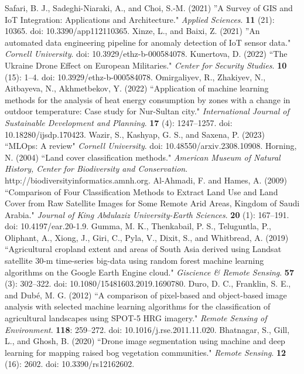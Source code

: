 \documentclass[3p,times,procedia]{elsarticle}
\begin{document}
\begin{thebibliography}{}
Safari, B. J., Sadeghi-Niaraki, A., and Choi, S.-M. (2021) ''A Survey of GIS and IoT Integration: Applications and Architecture." {\it Applied Sciences}. {\bf 11} (21): 10365. doi: 10.3390/app112110365.
Xinze, L., and Baixi, Z. (2021) ''An automated data engineering pipeline for anomaly detection of IoT sensor data." {\it Cornell University}. doi: 10.3929/ethz-b-000584078.
Kunertova, D. (2022) ``The Ukraine Drone Effect on European Militaries." {\it  Center for Security Studies}. {\bf 10} (15): 1--4. doi: 10.3929/ethz-b-000584078.
Omirgaliyev, R., Zhakiyev, N., Aitbayeva, N., Akhmetbekov, Y. (2022) ``Application of machine learning methods for the analysis of heat energy consumption by zones with a change in outdoor temperature: Case study for Nur-Sultan city." {\it  International Journal of Sustainable Development and Planning}. {\bf 17} (4): 1247--1257. doi: 10.18280/ijsdp.170423.
Wazir, S., Kashyap, G. S., and Saxena, P. (2023) ``MLOps: A review" {\it  Cornell University}. doi: 10.48550/arxiv.2308.10908.
Horning, N. (2004) ``Land cover classification methods." {\it American Museum of Natural History, Center for Biodiversity and Conservation}. http://biodiversityinformatics.amnh.org.
Al-Ahmadi, F. and Hames, A. (2009) ``Comparison of Four Classification Methods to Extract Land Use and Land Cover from Raw Satellite Images for Some Remote Arid Areas, Kingdom of Saudi Arabia." {\it Journal of King Abdulaziz University-Earth Sciences}. {\bf 20} (1): 167--191. doi: 10.4197/ear.20-1.9.
Gumma, M. K., Thenkabail, P. S., Teluguntla, P., Oliphant, A., Xiong, J., Giri, C., Pyla, V., Dixit, S., and Whitbread, A. (2019) ``Agricultural cropland extent and areas of South Asia derived using Landsat satellite 30-m time-series big-data using random forest machine learning algorithms on the Google Earth Engine cloud." {\it Giscience & Remote Sensing}. {\bf 57} (3): 302--322. doi: 10.1080/15481603.2019.1690780.
Duro, D. C., Franklin, S. E., and Dubé, M. G. (2012) ``A comparison of pixel-based and object-based image analysis with selected machine learning algorithms for the classification of agricultural landscapes using SPOT-5 HRG imagery." {\it Remote Sensing of Environment}. {\bf 118}: 259--272. doi: 10.1016/j.rse.2011.11.020.
Bhatnagar, S., Gill, L., and Ghosh, B. (2020) ``Drone image segmentation using machine and deep learning for mapping raised bog vegetation communities." {\it Remote Sensing}. {\bf 12} (16): 2602. doi: 10.3390/rs12162602.

\end{thebibliography}
\end{document}
